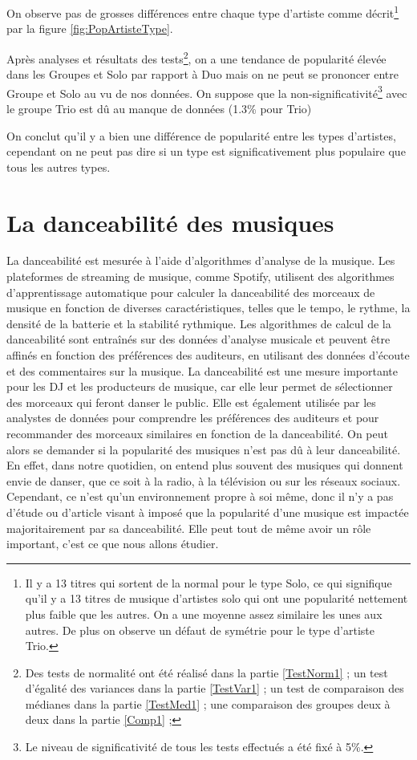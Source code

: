 \documentclass[french,]{compterendu}
\let\rmarkdownfootnote\footnote%
\def\footnote{\protect\rmarkdownfootnote}
\theoremstyle{urcastyle}
\theoremstyle{remark}
\begin{document}
On observe pas de grosses différences entre chaque type d'artiste comme décrit\footnote{Il y a 13 titres qui sortent de la normal pour le type Solo, ce qui signifique qu'il y a 13 titres de musique d'artistes solo qui ont une popularité nettement plus faible que les autres. On a une moyenne assez similaire les unes aux autres. De plus on observe un défaut de symétrie pour le type d'artiste Trio.} par la figure \ref{fig:PopArtisteType}.

Après analyses et résultats des tests\footnote{Des tests de normalité ont été réalisé dans la partie \ref{TestNorm1} ; un test d'égalité des variances dans la partie \ref{TestVar1} ; un test de comparaison des médianes dans la partie \ref{TestMed1} ; une comparaison des groupes deux à deux dans la partie \ref{Comp1} ;}, on a une tendance de popularité élevée dans les Groupes et Solo par rapport à Duo mais on ne peut se prononcer entre Groupe et Solo au vu de nos données.
On suppose que la non-significativité\footnote{Le niveau de significativité de tous les tests effectués a été fixé à 5\%.} avec le groupe Trio est dû au manque de données (1.3\% pour Trio)

On conclut qu'il y a bien une différence de popularité entre les types d'artistes, cependant on ne peut pas dire si un type est significativement plus populaire que tous les autres types.

\hypertarget{la-danceabilituxe9-des-musiques}{%
\section{La danceabilité des musiques}\label{la-danceabilituxe9-des-musiques}}

La danceabilité est mesurée à l'aide d'algorithmes d'analyse de la musique. Les plateformes de streaming de musique, comme Spotify, utilisent des algorithmes d'apprentissage automatique pour calculer la danceabilité des morceaux de musique en fonction de diverses caractéristiques, telles que le tempo, le rythme, la densité de la batterie et la stabilité rythmique. Les algorithmes de calcul de la danceabilité sont entraînés sur des données d'analyse musicale et peuvent être affinés en fonction des préférences des auditeurs, en utilisant des données d'écoute et des commentaires sur la musique. \newline
La danceabilité est une mesure importante pour les DJ et les producteurs de musique, car elle leur permet de sélectionner des morceaux qui feront danser le public. Elle est également utilisée par les analystes de données pour comprendre les préférences des auditeurs et pour recommander des morceaux similaires en fonction de la danceabilité. \newline
On peut alors se demander si la popularité des musiques n'est pas dû à leur danceabilité. En effet, dans notre quotidien, on entend plus souvent des musiques qui donnent envie de danser, que ce soit à la radio, à la télévision ou sur les réseaux sociaux. Cependant, ce n'est qu'un environnement propre à soi même, donc il n'y a pas d'étude ou d'article visant à imposé que la popularité d'une musique est impactée majoritairement par sa danceabilité. Elle peut tout de même avoir un rôle important, c'est ce que nous allons étudier.
\end{document}
